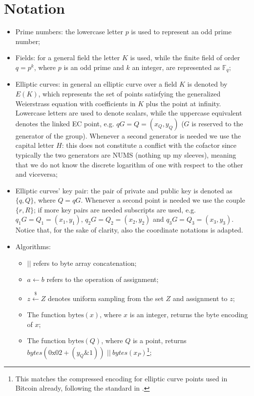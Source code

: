 \section{Notation}
\begin{itemize}
\item Prime numbers: the lowercase letter $p$ is used to represent an odd prime number;
\item Fields: for a general field the letter $K$ is used, while the finite field of order $q = p^k$, where $p$ is an odd prime and $k$ an integer, are represented as $\mathbb{F}_q$;
\item Elliptic curves: in general an elliptic curve over a field $K$ is denoted by $E(K)$, which represents the set of points satisfying the generalized Weierstrass equation with coefficients in $K$ plus the point at infinity. Lowercase letters are used to denote scalars, while the uppercase equivalent denotes the linked EC point, e.g. $qG = Q = (x_Q, y_Q)$ ($G$ is reserved to the generator of the group). Whenever a second generator is needed we use the capital letter $H$: this does not constitute a conflict with the cofactor since typically the two generators are NUMS (nothing up my sleeves), meaning that we do not know the discrete logarithm of one with respect to the other and viceversa;
\item Elliptic curves' key pair: the pair of private and public key is denoted as $\{q, Q\}$, where $Q = qG$. Whenever a second point is needed we use the couple $\{r, R\}$; if more key pairs are needed subscripts are used, e.g. $q_1G = Q_1 = (x_1, y_1)$, $q_2G = Q_2 = (x_2, y_2)$ and $q_3G = Q_3 = (x_3, y_3)$. Notice that, for the sake of clarity, also the coordinate notations is adapted.
\item Algorithms:
    \begin{itemize}
		\item $||$ refers to byte array concatenation;
		\item $a \gets b$ refers to the operation of assignment;
		\item $z \xleftarrow{\text{\$}} Z$ denotes uniform sampling from the set $Z$ and assignment to $z$;
		\item The function $\text{bytes}(x)$, where $x$ is an integer, returns the byte encoding of $x$;
		\item The function $\text{bytes}(Q)$, where $Q$ is a point, returns $bytes(0\text{x}02 + (y_Q \& 1))$ $ || \ bytes(x_P)$\footnote{This matches the compressed encoding for elliptic curve points used in Bitcoin already, following the standard in \cite{RefWork:2}.};

\end{itemize}
\end{itemize}
